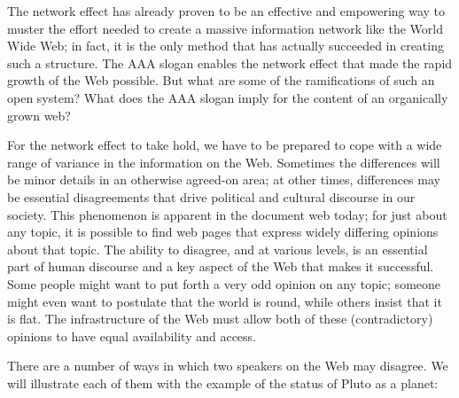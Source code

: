 The network effect has already proven to be an effective and empowering
way to muster the effort needed to create a massive information network
like the World Wide Web; in fact, it is the only method that has
actually succeeded in creating such a structure. The AAA slogan enables
the network effect that made the rapid growth of the Web possible. But
what are some of the ramifications of such an open system? What does the
AAA slogan imply for the content of an organically grown web?

For the network effect to take hold, we have to be prepared to cope with
a wide range of variance in the information on the Web. Sometimes the
differences will be minor details in an otherwise agreed-on area; at
other times, differences may be essential disagreements that drive
political and cultural discourse in our society. This phenomenon is
apparent in the document web today; for just about any topic, it is
possible to find web pages that express widely differing opinions about
that topic. The ability to disagree, and at various levels, is an
essential part of human discourse and a key aspect of the Web that makes
it successful. Some people might want to put forth a very odd opinion on
any topic; someone might even want to postulate that the world is round,
while others insist that it is flat. The infrastructure of the Web must
allow both of these (contradictory) opinions to have equal availability
and access.

There are a number of ways in which two speakers on the Web may
disagree. We will illustrate each of them with the example of the status
of Pluto as a planet:



